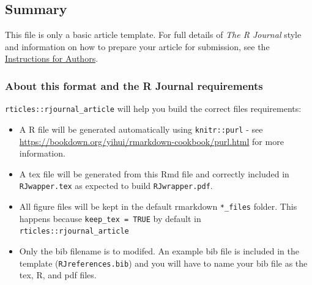 \hypertarget{summary}{%
\subsection{Summary}\label{summary}}

This file is only a basic article template. For full details of
\emph{The R Journal} style and information on how to prepare your
article for submission, see the
\href{https://journal.r-project.org/share/author-guide.pdf}{Instructions
for Authors}.

\hypertarget{about-this-format-and-the-r-journal-requirements}{%
\subsubsection{About this format and the R Journal
requirements}\label{about-this-format-and-the-r-journal-requirements}}

\texttt{rticles::rjournal\_article} will help you build the correct
files requirements:

\begin{itemize}
\tightlist
\item
  A R file will be generated automatically using \texttt{knitr::purl} -
  see \url{https://bookdown.org/yihui/rmarkdown-cookbook/purl.html} for
  more information.
\item
  A tex file will be generated from this Rmd file and correctly included
  in \texttt{RJwapper.tex} as expected to build \texttt{RJwrapper.pdf}.
\item
  All figure files will be kept in the default rmarkdown
  \texttt{*\_files} folder. This happens because
  \texttt{keep\_tex\ =\ TRUE} by default in
  \texttt{rticles::rjournal\_article}
\item
  Only the bib filename is to modifed. An example bib file is included
  in the template (\texttt{RJreferences.bib}) and you will have to name
  your bib file as the tex, R, and pdf files.
\end{itemize}



\address{%
Tommy Jones\\
Foundation\\%
1600 N Quinn St.~APT 202\\ Arlington, VA 22209\\
%
\url{https://journal.r-project.org}\\%
\textit{ORCiD: \href{https://orcid.org/0000-0001-6457-2452}{0000-0001-6457-2452}}\\%
\href{mailto:tommy@foundatn.com}{\nolinkurl{tommy@foundatn.com}}%
}

\address{%
Mark J. Meyer\\
Georgetown University\\%
3700 O St NW\\ Washington, DC 20057\\
%
\url{https://journal.r-project.org}\\%
\textit{ORCiD: \href{https://orcid.org/0000-0003-3942-9675}{0000-0003-3942-9675}}\\%
\href{mailto:mjm556@georgetown.edu}{\nolinkurl{mjm556@georgetown.edu}}%
}
